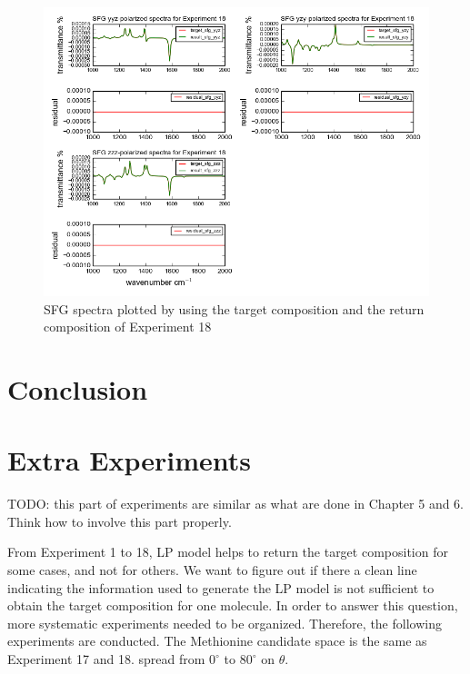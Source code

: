 \begin{figure}[!ht] 
\centering
\includegraphics[scale=0.7]{Figures/chapter4_result_target_plotting_500datapoint_sfg.png}
\caption{SFG spectra plotted by using the target composition and the return composition of Experiment 18} \label{fig:4.7}
\end{figure} 

\section{Conclusion}

\section{Extra Experiments}
TODO: this part of experiments are similar as what are done in Chapter 5 and 6. Think how to involve this part properly.

From Experiment 1 to 18, LP model helps to return the target composition for some cases, and not for others. We want to figure out if there a clean line indicating the information used to generate the LP model is not sufficient to obtain the target composition for one molecule. In order to answer this question, more systematic experiments needed to be organized. Therefore, the following experiments are conducted. The Methionine candidate space is the same as Experiment 17 and 18. spread from $0^{\circ}$ to $80^{\circ}$ on $\theta$. 





